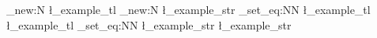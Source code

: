 \tl_new:N
  \l_example_tl
\str_new:N
  \l_example_str
\str_set_eq:NN  %
  \l_example_tl
  \l_example_tl
\tl_set_eq:NN  %
  \l_example_str
  \l_example_str
